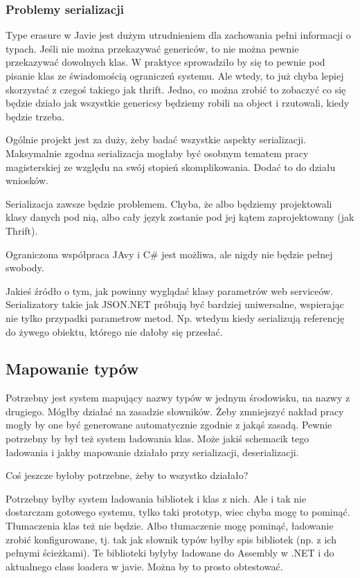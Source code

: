 \subsubsection{Problemy serializacji}
Type erasure w Javie jest dużym utrudnieniem dla zachowania pełni informacji o typach.
Jeśli nie można przekazywać genericów, to nie można pewnie przekazywać dowolnych klas. W praktyce sprowadziło by się to pewnie pod pisanie klas ze świadomością ograniczeń systemu. Ale wtedy, to już chyba lepiej skorzystać z czegoś takiego jak thrift.
Jedno, co można zrobić to zobaczyć co się będzie działo jak wszystkie genericsy będziemy robili na object i rzutowali, kiedy będzie trzeba.

Ogólnie projekt jest za duży, żeby badać wszystkie aspekty serializacji. Maksymalnie zgodna serializacja mogłaby być osobnym tematem pracy magisterskiej ze względu na swój stopień skomplikowania.
Dodać to do działu wniosków.

Serializacja zawsze będzie problemem. Chyba, że albo będziemy projektowali klasy danych pod nią, albo cały język zostanie pod jej kątem zaprojektowany (jak Thrift).

Ograniczona współpraca JAvy i C\# jest możliwa, ale nigdy nie będzie pełnej swobody.

Jakieś źródło o tym, jak powinny wyglądać klasy parametrów web serviceów.
Serializatory takie jak JSON.NET próbują być bardziej uniwersalne, wspierając nie tylko przypadki parametrow metod. Np. wtedym kiedy serializują referencję do żywego obiektu, którego nie dałoby się przesłać.


\subsection{Mapowanie typów}
Potrzebny jest system mapujący nazwy typów w jednym środowisku, na nazwy z drugiego. Mógłby działać na zasadzie słowników. Żeby zmniejszyć nakład pracy mogły by one być generowane automatycznie zgodnie z jakąś zasadą.
Pewnie potrzebny by był też system ładowania klas.
Może jakiś schemacik tego ładowania i jakby mapowanie działało przy serializacji, deserializacji.

Coś jeszcze byłoby potrzebne, żeby to wszystko działało?

Potrzebny byłby system ładowania bibliotek i klas z nich. Ale i tak nie dostarczam gotowego systemu, tylko taki prototyp, wiec chyba mogę to pominąć. Tłumaczenia klas też nie będzie. Albo tłumaczenie mogę pominąć, ładowanie zrobić konfigurowane, tj. tak jak słownik typów byłby spis bibliotek (np. z ich pełnymi ścieżkami). Te biblioteki byłyby ładowane do Assembly w .NET i do aktualnego class loadera w javie. Można by to prosto obtestować.


